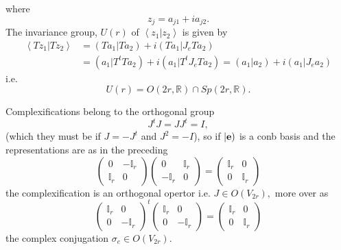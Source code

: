 \documentclass[aps,preprint]{revtex4}
\begin{document}
where 
\begin{equation}
z_{j}=a_{j1}+ia_{j2}.
\end{equation}
The invariance group, $U\left( r\right) $ of $\left\langle \left.
z_{1}\right\vert z_{2}\right\rangle $ is given by 
\begin{align}
\left\langle \left. Tz_{1}\right\vert Tz_{2}\right\rangle & =\left( \left.
Ta_{1}\right\vert Ta_{2}\right) +i\left( \left. Ta_{1}\right\vert
J_{e}Ta_{2}\right) \\
& =\left( \left. a_{1}\right\vert T^{t}Ta_{2}\right) +i\left( \left.
a_{1}\right\vert T^{t}J_{e}Ta_{2}\right) =\left( \left. a_{1}\right\vert
a_{2}\right) +i\left( \left. a_{1}\right\vert J_{e}a_{2}\right)
\end{align}
i.e. 
\begin{equation}
U\left( r\right) =O\left( 2r,\mathbb{R}\right) \cap Sp\left( 2r,\mathbb{R}%
\right) .
\end{equation}

Complexifications belong to the orthogonal group 
\begin{equation}
J^{t}J=JJ^{t}=I,
\end{equation}
(which they must be if $J=-J^{t}$ and $J^{2}=-I$), so if $\left\vert \mathbf{%
e}\right) $ is a conb basis and the representations are as in the preceding 
\begin{equation}
\left( 
\begin{array}{cc}
0 & -\mathbb{I}_{r} \\ 
\mathbb{I}_{r} & 0%
\end{array}
\right) \left( 
\begin{array}{cc}
0 & \mathbb{I}_{r} \\ 
-\mathbb{I}_{r} & 0%
\end{array}
\right) =\left( 
\begin{array}{cc}
\mathbb{I}_{r} & 0 \\ 
0 & \mathbb{I}_{r}%
\end{array}
\right)
\end{equation}
the complexification is an orthogonal opertor i.e. $J\in O\left(
V_{2r}\right) ,$ more over as 
\begin{equation}
\left( 
\begin{array}{cc}
\mathbb{I}_{r} & 0 \\ 
0 & -\mathbb{I}_{r}%
\end{array}
\right) ^{t}\left( 
\begin{array}{cc}
\mathbb{I}_{r} & 0 \\ 
0 & -\mathbb{I}_{r}%
\end{array}
\right) =\left( 
\begin{array}{cc}
\mathbb{I}_{r} & 0 \\ 
0 & \mathbb{I}_{r}%
\end{array}
\right)
\end{equation}
the complex conjugation $\sigma_{e}\in O\left( V_{2r}\right) .$
\end{document}
